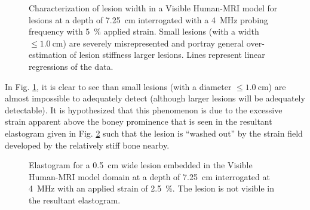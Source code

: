 			\begin{figure}[!htb]
				\centering
				\caption[Quasi-static Visible Human model lesion width characterization]{Characterization of lesion width in a Visible Human-MRI model for lesions at a depth of \SI{7.25}{\cm} interrogated with a \SI{4}{\MHz} probing frequency with \SI{5}{\percent} applied strain. Small lesions (with a width $\leq \SI{1.0}{\cm}$) are severely misrepresented and portray general over-estimation of lesion stiffness larger lesions. Lines represent linear regressions of the data.}
				\label{fig:human_size_characterization}
			\end{figure}

			In Fig. \ref{fig:human_size_characterization}, it is clear to see than small lesions (with a diameter $\leq \SI{1.0}{\cm}$) are almost impossible to adequately detect (although larger lesions will be adequately detectable). It is hypothesized that this phenomenon is due to the excessive strain apparent above the boney prominence that is seen in the resultant elastogram given in Fig. \ref{fig:human_elastogram} such that the lesion is ``washed out'' by the strain field developed by the relatively stiff bone nearby.

			\begin{figure}[!htb]
				\centering
				\caption[Sample elastogram of a Visible Human model lesion]{Elastogram for a \SI{0.5}{\cm} wide lesion embedded in the Visible Human-MRI model domain at a depth of \SI{7.25}{\cm} interrogated at \SI{4}{\MHz} with an applied strain of \SI{2.5}{\percent}. The lesion is not visible in the resultant elastogram.}
				\label{fig:human_elastogram}
			\end{figure}

